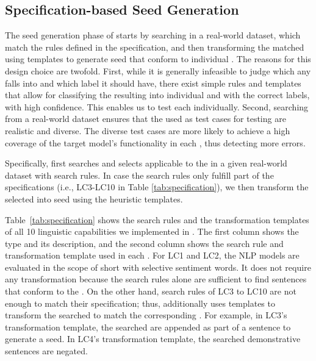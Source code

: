 \subsection{Specification-based Seed Generation}
The seed generation phase of \tool starts by searching \sents in a real-world dataset, which match the rules defined in the \lc
specification, and then transforming the matched \sents using
templates to generate seed \sents that conform to individual
\lcs. The reasons for this design choice are twofold.  First, while it is generally infeasible to judge which \lc any \sent falls into and which label it
should have, there exist simple rules and templates that 
allow for classifying the resulting \sents into individual \lcs and
with the correct labels, with high confidence.  This enables us to
test each \lc individually.  Second, searching from a real-world
dataset ensures that the \sents used as test cases for testing \lcs
are realistic and diverse. The diverse test cases are more likely to
achieve a high coverage of the target model's functionality in each
\lc, thus detecting more errors.

Specifically, \tool first searches and selects \sents applicable to
the \lc in a given real-world dataset with search rules. In case
the search rules only fulfill part of the \lc specifications (i.e., LC3-LC10 in Table \ref{tab:specification}), we then
transform the selected \sents into seed \sents using the
heuristic templates.

Table~\ref{tab:specification} shows the search rules and the
transformation templates of all 10 linguistic capabilities we
implemented in \tool. The first column shows the \lc type and its
description, and the second column shows the search rule and
transformation template used in each \lc. For LC1 and LC2, the NLP
models are evaluated in the scope of short \sents with selective
sentiment words. It does not require any
transformation because the search rules alone are sufficient to find sentences that conform
to the \lcs. On the other hand, search rules of LC3 to LC10 are not enough to match their \lc specification; thus, \tool additionally uses 
templates to transform the searched \sents to match the corresponding \lc. For example, in LC3's transformation template, the searched \sents are appended as part of a sentence to generate a seed.
In LC4's transformation template, the searched demonstrative sentences are negated.

